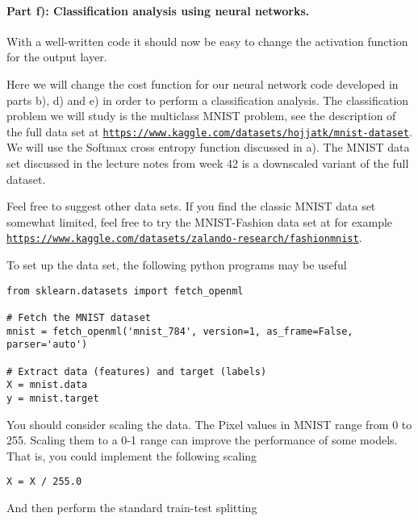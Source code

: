 \documentclass[%
oneside,                 %
final,                   %
10pt]{article}
\begin{document}
\paragraph{Part f): Classification  analysis using neural networks.}
With a well-written code it should now be easy to change the
activation function for the output layer.

Here we will change the cost function for our neural network code
developed in parts b), d) and e) in order to perform a classification
analysis.  The classification problem we will study is the multiclass
MNIST problem, see the description of the full data set at
\href{{https://www.kaggle.com/datasets/hojjatk/mnist-dataset}}{\nolinkurl{https://www.kaggle.com/datasets/hojjatk/mnist-dataset}}. We will use the Softmax cross entropy function discussed in a). 
The MNIST data set discussed in the lecture notes from week 42 is a downscaled variant of the full dataset. 

Feel free to suggest other data sets. If you find the classic MNIST data set somewhat limited, feel free to try the  
MNIST-Fashion data set at for example \href{{https://www.kaggle.com/datasets/zalando-research/fashionmnist}}{\nolinkurl{https://www.kaggle.com/datasets/zalando-research/fashionmnist}}.

To set up the data set, the following python programs may be useful









\begin{verbatim}
from sklearn.datasets import fetch_openml

# Fetch the MNIST dataset
mnist = fetch_openml('mnist_784', version=1, as_frame=False, parser='auto')

# Extract data (features) and target (labels)
X = mnist.data
y = mnist.target

\end{verbatim}

You should consider scaling the data. The Pixel values in MNIST range from 0 to 255. Scaling them to a 0-1 range can improve the performance of some models. That is, you could implement the following scaling


\begin{verbatim}
X = X / 255.0

\end{verbatim}

And then perform the standard train-test splitting
\end{document}
